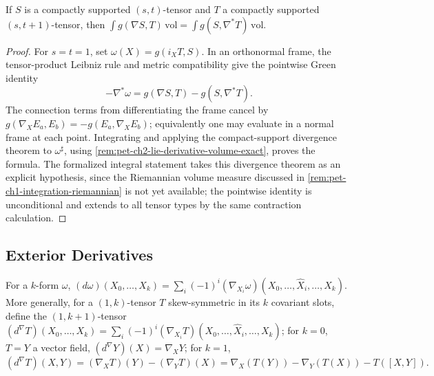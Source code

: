\begin{proposition}
  \label{prop:pet-ch2-adjoint-integral-identity}
  \leanok
  If $S$ is a compactly supported $(s,t)$-tensor and $T$ a compactly supported
  $(s,t+1)$-tensor, then $\int g(\nabla S,T)\,\mathrm{vol}=\int g(S,\nabla^*T)\,\mathrm{vol}$.
\end{proposition}
\begin{proof}
  \sketch
  For $s=t=1$, set
  $\omega(X)=g(i_XT,S)$. In an orthonormal frame, the tensor-product
  Leibniz rule and metric compatibility give the pointwise Green identity
  \[
    -\nabla^*\omega=g(\nabla S,T)-g(S,\nabla^*T).
  \]
  The connection terms from differentiating the frame cancel by
  $g(\nabla_XE_a,E_b)=-g(E_a,\nabla_XE_b)$; equivalently one may evaluate in a
  normal frame at each point. Integrating and applying the compact-support
  divergence theorem to $\omega^\sharp$, using
  \cref{rem:pet-ch2-lie-derivative-volume-exact}, proves the formula. The
  formalized integral statement takes this divergence theorem as an explicit
  hypothesis, since the Riemannian volume measure discussed in
  \cref{rem:pet-ch1-integration-riemannian} is not yet available; the pointwise
  identity is unconditional and extends to all tensor types by the same
  contraction calculation.
\end{proof}

\subsection{Exterior Derivatives}

\begin{definition}
  \label{def:pet-ch2-exterior-derivative-covariant}
  \leanok
  For a $k$-form $\omega$, $(d\omega)(X_0,\dots,X_k)=\sum_i(-1)^i(\nabla_{X_i}\omega)(X_0,\dots,\hat X_i,\dots,X_k)$.
  More generally, for a $(1,k)$-tensor $T$ skew-symmetric in its $k$
  covariant slots, define the $(1,k+1)$-tensor
  $(d^\nabla T)(X_0,\dots,X_k)=\sum_i(-1)^i(\nabla_{X_i}T)(X_0,\dots,\hat X_i,\dots,X_k)$;
  for $k=0$, $T=Y$ a vector field, $(d^\nabla Y)(X)=\nabla_XY$; for $k=1$,
  \[
    (d^\nabla T)(X,Y)=(\nabla_XT)(Y)-(\nabla_YT)(X)
    =\nabla_X(T(Y))-\nabla_Y(T(X))-T([X,Y]).
  \]
\end{definition}

